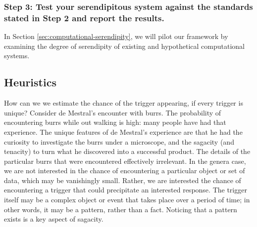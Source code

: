 \subsubsection*{Step 3: Test your serendipitous system against the standards stated in Step 2 and report the results.}

\noindent In Section \ref{sec:computational-serendipity}, we will pilot our framework by examining the degree of serendipity of existing and hypothetical computational systems. 

\subsection{Heuristics}\label{specs-heuristics}

How can we we estimate the chance of the trigger appearing, if every
trigger is unique?  Consider de Mestral's encounter with burrs.
The probability of encountering burrs while out walking is high: many
people have had that experience.  The unique features of de Mestral's
experience are that he had the curiosity to investigate the burrs
under a microscope, and the sagacity (and tenacity) to turn what he
discovered into a successful product.  The details of the particular
burrs that were encountered effectively irrelevant.  In the genera case, we are not interested in the chance of encountering a particular object or set of data, which may be vanishingly small.  Rather, we are interested the chance of encountering a trigger that could precipitate an interested response.  The trigger itself may be a complex object or event that takes place over a period of time; in other words, it may be a pattern, rather than a fact.  Noticing that a pattern exists is a key aspect of sagacity.
